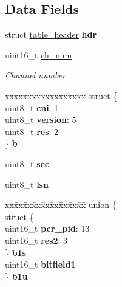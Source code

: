 \subsection*{Data Fields}
\begin{DoxyCompactItemize}
\item 
struct \hyperlink{structtable__header}{table\+\_\+header} {\bfseries hdr}\hypertarget{structpmt__header_a4465cd3a99485194d350b7b09c53a2cd}{}\label{structpmt__header_a4465cd3a99485194d350b7b09c53a2cd}

\item 
uint16\+\_\+t \hyperlink{structpmt__header_a24dc7745cd87ad20cb408dd2969d63bf}{ch\+\_\+num}\hypertarget{structpmt__header_a24dc7745cd87ad20cb408dd2969d63bf}{}\label{structpmt__header_a24dc7745cd87ad20cb408dd2969d63bf}

\begin{DoxyCompactList}\small\item\em Channel number. \end{DoxyCompactList}\item 
\begin{tabbing}
xx\=xx\=xx\=xx\=xx\=xx\=xx\=xx\=xx\=\kill
struct \{\\
\>uint8\_t {\bfseries cni}: 1\\
\>uint8\_t {\bfseries version}: 5\\
\>uint8\_t {\bfseries res}: 2\\
\} {\bfseries b}\hypertarget{structpmt__header_ad208096cf9e2655c5a164a9a125c7628}{}\label{structpmt__header_ad208096cf9e2655c5a164a9a125c7628}
\\

\end{tabbing}\item 
uint8\+\_\+t {\bfseries sec}\hypertarget{structpmt__header_a03530eddceb04a019b9be2edb8ea242b}{}\label{structpmt__header_a03530eddceb04a019b9be2edb8ea242b}

\item 
uint8\+\_\+t {\bfseries lsn}\hypertarget{structpmt__header_a035caa954eccf721aee42eddaa823d85}{}\label{structpmt__header_a035caa954eccf721aee42eddaa823d85}

\item 
\begin{tabbing}
xx\=xx\=xx\=xx\=xx\=xx\=xx\=xx\=xx\=\kill
union \{\\
\>struct \{\\
\>\>uint16\_t {\bfseries pcr\_pid}: 13\\
\>\>uint16\_t {\bfseries res2}: 3\\
\>\} {\bfseries b1s}\\
\>uint16\_t {\bfseries bitfield1}\\
\} {\bfseries b1u}\hypertarget{structpmt__header_a6b90ad8cfb7ae94d769c1dcd589f4f4f}{}\label{structpmt__header_a6b90ad8cfb7ae94d769c1dcd589f4f4f}
\\


\end{tabbing}
\end{DoxyCompactItemize}
